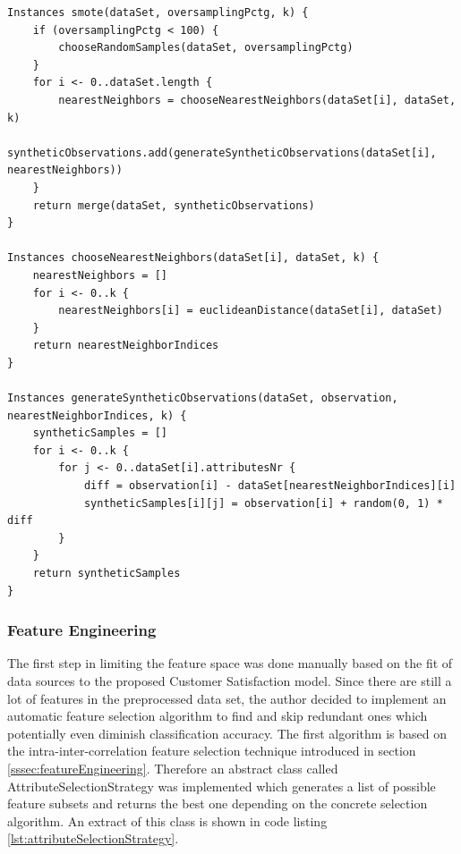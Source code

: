 \begin{lstlisting}[caption={SMOTE algorithm in pseudo code}, label={lst:smote}]
Instances smote(dataSet, oversamplingPctg, k) {
	if (oversamplingPctg < 100) {
		chooseRandomSamples(dataSet, oversamplingPctg)
	}
	for i <- 0..dataSet.length {
		nearestNeighbors = chooseNearestNeighbors(dataSet[i], dataSet, k)
		syntheticObservations.add(generateSyntheticObservations(dataSet[i], nearestNeighbors))
	}
	return merge(dataSet, syntheticObservations)
}

Instances chooseNearestNeighbors(dataSet[i], dataSet, k) {
	nearestNeighbors = []
	for i <- 0..k {
		nearestNeighbors[i] = euclideanDistance(dataSet[i], dataSet)
	}
	return nearestNeighborIndices
}

Instances generateSyntheticObservations(dataSet, observation, nearestNeighborIndices, k) {
	syntheticSamples = []
	for i <- 0..k {
		for j <- 0..dataSet[i].attributesNr {
			diff = observation[i] - dataSet[nearestNeighborIndices][i]
			syntheticSamples[i][j] = observation[i] + random(0, 1) * diff
		}
	}
	return syntheticSamples
}
\end{lstlisting}

\subsubsection{Feature Engineering}
The first step in limiting the feature space was done manually based on the fit of data sources to the proposed Customer Satisfaction model. Since there are still a lot of features in the preprocessed data set, the author decided to implement an automatic feature selection algorithm to find and skip redundant ones which potentially even diminish classification accuracy. The first algorithm is based on the intra-inter-correlation feature selection technique introduced in section \ref{sssec:featureEngineering}. Therefore an abstract class called AttributeSelectionStrategy was implemented which generates a list of possible feature subsets and returns the best one depending on the concrete selection algorithm. An extract of this class is shown in code listing \ref{lst:attributeSelectionStrategy}.

